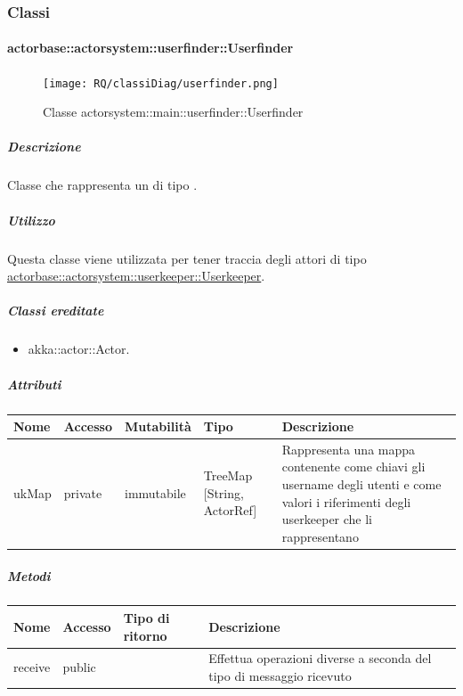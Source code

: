 \documentclass{scalatekids-article}
\begin{document}
\subsubsection{Classi}

\paragraph{actorbase::actorsystem::userfinder::Userfinder}
\label{sec:actorbase::actorsystem::userfinder::Userfinder}

\begin{figure}[H]
  \begin{center}
    \texttt{[image: RQ/classiDiag/userfinder.png]}
    \caption{Classe actorsystem::main::userfinder::Userfinder}
  \end{center}
\end{figure}

\subparagraph{Descrizione}
Classe che rappresenta un  di tipo .

\subparagraph{Utilizzo}
Questa classe viene utilizzata per tener traccia degli attori di tipo
\hyperref[sec:actorbase::actorsystem::userkeeper::Userkeeper]{actorbase::actorsystem::userkeeper::Userkeeper}.

\subparagraph{Classi ereditate}
\begin{itemize}
\item akka::actor::Actor.
\end{itemize}

\subparagraph{Attributi}
\begin{tabular}{| p{3cm} | p{1.5cm} | p{2cm} | p{2cm} | p{8.5cm} |}
  \hline
  Nome & Accesso & Mutabilità & Tipo & Descrizione\\
  \hline
  ukMap & private & immutabile & TreeMap [String, ActorRef] & Rappresenta una mappa contenente come chiavi gli username degli utenti e come valori i riferimenti degli userkeeper che li rappresentano \\
  \hline
\end{tabular}

\subparagraph{Metodi}

\begin{tabular}{| l | l | l | l |}
  \hline
  Nome & Accesso & Tipo di ritorno & Descrizione\\
  \hline
  receive & public &  & Effettua operazioni diverse a seconda del tipo di messaggio ricevuto\\
  \hline
\end{tabular}
\end{document}
